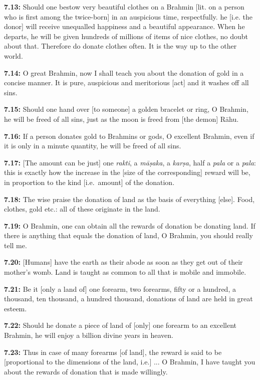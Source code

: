 \documentclass{article}
\newcommand{\vsnum}[1]{\textbf{#1}}
\newcommand{\skt}[1]{\textit{#1}}
\begin{document}
\vsnum{7.13: }Should one bestow very beautiful clothes on a Brahmin [lit. on a person who is first among the twice-born] in an auspicious time, respectfully. he [i.e. the donor] will receive unequalled happiness and a beautiful appearance. When he departs, he will be given hundreds of millions of items of nice clothes, no doubt about that. Therefore do donate clothes often. It is the way up to the other world.

\vsnum{7.14: }O great Brahmin, now I shall teach you about the donation of gold in a concise manner. It is pure, auspicious and meritorious [act] and it washes off all sins.

\vsnum{7.15: }Should one hand over [to someone] a golden bracelet or ring, O Brahmin, he will be freed of all sins, just as the moon is freed from [the demon] Rāhu.

\vsnum{7.16: }If a person donates gold to Brahmins or gods, O excellent Brahmin, even if it is only in a minute quantity, he will be freed of all sins.

\vsnum{7.17: }[The amount can be just] one \skt{rakti}, a \skt{māṣaka}, a \skt{karṣa}, half a \skt{pala} or a \skt{pala}: this is exactly how the increase in the [size of the corresponding] reward will be, in proportion to the kind [i.e.\ amount] of the donation.

\vsnum{7.18: }The wise praise the donation of land as the basis of everything [else]. Food, clothes, gold etc.: all of these originate in the land.

\vsnum{7.19: }O Brahmin, one can obtain all the rewards of donation be donating land. If there is anything that equals the donation of land, O Brahmin, you should really tell me.

\vsnum{7.20: }[Humans] have the earth as their abode as soon as they get out of their mother's womb. Land is taught as common to all that is mobile and immobile.

\vsnum{7.21: }Be it [only a land of] one forearm, two forearms, fifty or a hundred, a thousand, ten thousand, a hundred thousand, donations of land are held in great esteem.

\vsnum{7.22: }Should he donate a piece of land of [only] one forearm to an excellent Brahmin, he will enjoy a billion divine years in heaven.

\vsnum{7.23: }Thus in case of many forearms [of land], the reward is said to be [proportional to the dimensions of the land, i.e.] ... O Brahmin, I have taught you about the rewards of donation that is made willingly.
\end{document}
